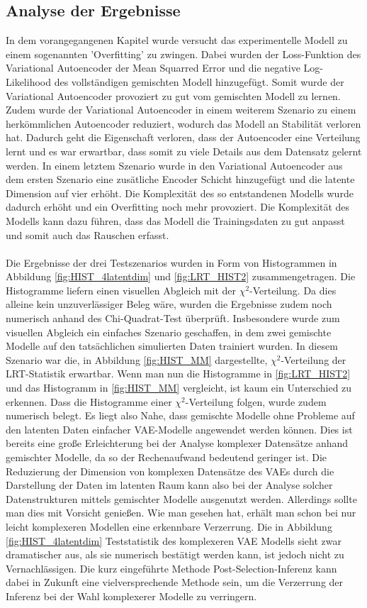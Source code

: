 \documentclass[%
thesis=student,%
coverpage=false,%
titlepage=false,%
headmarks=true, %
german,%
font=libertine, %
math=newpxtx, %
BCOR=5mm,%
coverBCOR=11mm%
]{tumbook}
\theoremstyle{break}
\begin{document}
\subsection{Analyse der Ergebnisse}
In dem vorangegangenen Kapitel wurde versucht das experimentelle Modell zu einem sogenannten 'Overfitting' zu zwingen. Dabei wurden der Loss-Funktion des Variational Autoencoder der Mean Squarred Error und die negative Log-Likelihood des vollständigen gemischten Modell hinzugefügt. Somit wurde der Variational Autoencoder provoziert zu gut vom gemischten Modell zu lernen. Zudem wurde der Variational Autoencoder in einem weiterem Szenario zu einem herkömmlichen Autoencoder reduziert, wodurch das Modell an Stabilität verloren hat. Dadurch geht die Eigenschaft verloren, dass der Autoencoder eine Verteilung lernt und es war erwartbar, dass somit zu viele Details aus dem Datensatz gelernt werden. In einem letztem Szenario wurde in den Variational Autoencoder aus dem ersten Szenario eine zusätliche Encoder Schicht hinzugefügt und die latente Dimension auf vier erhöht. Die Komplexität des so entstandenen Modells wurde dadurch erhöht und ein Overfitting noch mehr provoziert. Die Komplexität des Modells kann dazu führen, dass das Modell die Trainingsdaten zu gut anpasst und somit auch das Rauschen erfasst.\\
\\
Die Ergebnisse der drei Testszenarios wurden in Form von Histogrammen in Abbildung \ref{fig:HIST_4latentdim} und \ref{fig:LRT_HIST2} zusammengetragen. Die Histogramme liefern einen visuellen Abgleich mit der $\chi^2$-Verteilung. Da dies alleine kein unzuverlässiger Beleg wäre, wurden die Ergebnisse zudem noch numerisch anhand des Chi-Quadrat-Test überprüft. Insbesondere wurde zum visuellen Abgleich ein einfaches Szenario geschaffen, in dem zwei gemischte Modelle auf den tatsächlichen simulierten Daten trainiert wurden. In diesem Szenario war die, in Abbildung \ref{fig:HIST_MM} dargestellte, $\chi^2$-Verteilung der LRT-Statistik erwartbar. Wenn man nun die Histogramme in \ref{fig:LRT_HIST2} und das Histogramm in \ref{fig:HIST_MM} vergleicht, ist kaum ein Unterschied zu erkennen. Dass die Histogramme einer $\chi^2$-Verteilung folgen, wurde zudem numerisch belegt. Es liegt also Nahe, dass gemischte Modelle ohne Probleme auf den latenten Daten einfacher VAE-Modelle angewendet werden können. Dies ist bereits eine große Erleichterung bei der Analyse komplexer Datensätze anhand gemischter Modelle, da so der Rechenaufwand bedeutend geringer ist. Die Reduzierung der Dimension von komplexen Datensätze des VAEs durch die Darstellung der Daten im latenten Raum kann also bei der Analyse solcher Datenstrukturen mittels gemischter Modelle ausgenutzt werden. Allerdings sollte man dies mit Vorsicht genießen. Wie man gesehen hat, erhält man schon bei nur leicht komplexeren Modellen eine erkennbare Verzerrung. Die in Abbildung \ref{fig:HIST_4latentdim} Teststatistik des komplexeren VAE Modells sieht zwar dramatischer aus, als sie numerisch bestätigt werden kann, ist jedoch nicht zu Vernachlässigen. Die kurz eingeführte Methode Post-Selection-Inferenz kann dabei in Zukunft eine vielversprechende Methode sein, um die Verzerrung der Inferenz bei der Wahl komplexerer Modelle zu verringern.
\end{document}
